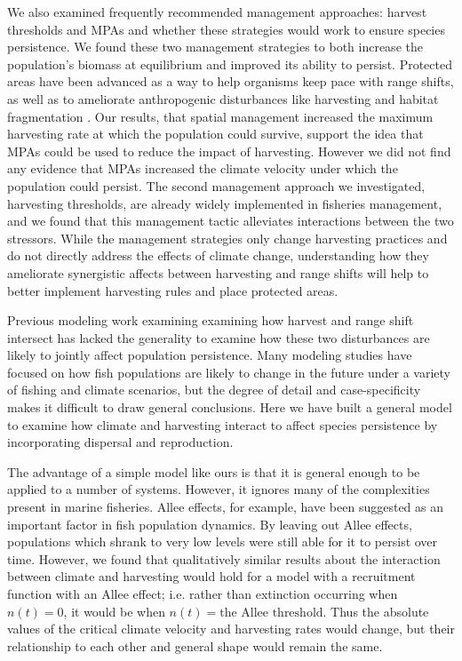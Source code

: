 \documentclass[12pt,english]{article}
\begin{document}
We also examined frequently recommended management approaches: harvest thresholds and MPAs and whether these strategies would work to ensure species persistence. We found these two management strategies to both increase the population's biomass at equilibrium and improved its ability to persist. Protected areas have been advanced as a way to help organisms keep pace with range shifts, as well as to ameliorate anthropogenic disturbances like harvesting and habitat fragmentation \citep{Lawleretal2010, Hannahetal2007,Botsfordetal2001, Gaylordetal2005, HastingsBotsford2003,Thomasetal2012}. Our results, that spatial management increased the maximum harvesting rate at which the population could survive, support the idea that MPAs could be used to reduce the impact of harvesting. However we did not find any evidence that MPAs increased the climate velocity under which the population could persist. The second management approach we investigated, harvesting thresholds, are already widely implemented in fisheries management, and we found that this management tactic alleviates interactions between the two stressors.   While the management strategies only change harvesting practices and do not directly address the effects of climate change, understanding how they ameliorate synergistic affects between harvesting and range shifts will help to better implement harvesting rules and place protected areas.

Previous modeling work examining examining how harvest and range shift intersect has lacked the generality to examine how these two disturbances are likely to jointly affect population persistence. Many modeling studies have focused on how fish populations are likely to change in the future under a variety of fishing and climate scenarios, but the degree of detail and case-specificity makes it difficult to draw general conclusions. Here we have built a general model to examine how climate and harvesting interact to affect species persistence by incorporating dispersal and reproduction. 

The advantage of a simple model like ours is that it is general enough to be applied to a number of systems.  However, it  ignores many of the complexities present in marine fisheries. Allee effects, for example, have been suggested as an important factor in fish population dynamics. By leaving out Allee effects, populations which shrank to very low levels were still able for it to persist over time. However, we found that qualitatively similar results about the interaction between climate and harvesting would hold for a model with a recruitment function with an Allee effect; i.e. rather than extinction occurring when $n(t)=0$, it would be when $n(t)=\text{the Allee threshold}$. Thus the absolute values of the critical climate velocity and harvesting rates would change, but their relationship to each other and general shape would remain the same. 
\end{document}
